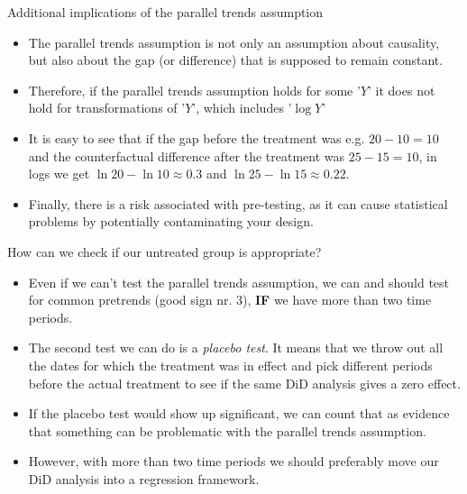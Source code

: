 \documentclass[notes,11pt, aspectratio=169]{beamer}
\begin{document}
\begin{frame}{Additional implications of the parallel trends assumption}
\begin{itemize}
    \item The parallel trends assumption is not only an assumption about causality, but also about the gap (or difference) that is supposed to remain constant.
    \item Therefore, if the parallel trends assumption holds for some '$Y$' it does not hold for transformations of '$Y$', which includes '$\log Y $'
    \item It is easy to see that if the gap before the treatment was e.g. $20-10 = 10$ and the counterfactual difference after the treatment was $25-15 = 10$, in logs we get $\ln 20 - \ln 10\approx0.3$ and $\ln 25 - \ln 15\approx0.22$. 
    \item Finally, there is a risk associated with pre-testing, as it can cause statistical problems by potentially contaminating your design.
\end{itemize}
\end{frame}

\begin{frame}{How can we check if our untreated group is appropriate?}
\begin{itemize}
\item Even if we can't test the parallel trends assumption, we can and should test for common pretrends (good sign nr. 3), \textbf{IF} we have more than two time periods.
\item The second test we can do is a \emph{placebo test}. It means that we throw out all the dates for which the treatment was in effect and pick different periods before the actual treatment to see if the same DiD analysis gives a zero effect.
\item If the placebo test would show up significant, we can count that as evidence that something can be problematic with the parallel trends assumption. 
\item However, with more than two time periods we should preferably move our DiD analysis into a regression framework.
\end{itemize}
\end{frame}
\end{document}
